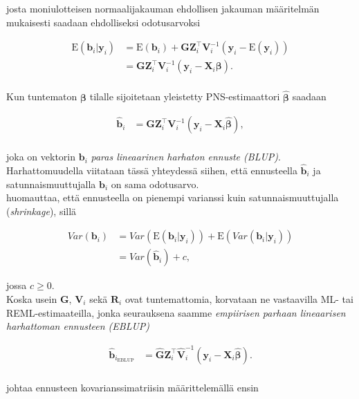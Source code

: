 \documentclass[finnish]{docopts}
\begin{document}
josta moniulotteisen normaalijakauman ehdollisen jakauman määritelmän mukaisesti saadaan ehdolliseksi odotusarvoksi

$$
\begin{aligned}
\text{E}(\bm{b}_i | \bm{y}_i) &= \text{E}(\bm{b}_i) + \bm{G} \bm{Z}_{i}^\top \bm{V}_{i}^{-1}(\bm{y}_i - \text{E}(\bm{y}_i)) \\
&= \bm{G} \bm{Z}_{i}^\top \bm{V}_{i}^{-1}(\bm{y}_i - \bm{X}_i \bm{\beta}). \\
\end{aligned}
$$

Kun tuntematon $\bm{\beta}$ tilalle sijoitetaan yleistetty PNS-estimaattori $\hat{\bm{\beta}}$ saadaan

$$
\begin{aligned}
\hat{\bm{b}}_i &= \bm{G} \bm{Z}_{i}^\top \bm{V}_{i}^{-1}(\bm{y}_i - \bm{X}_i \hat{\bm{\beta}}), \\
\end{aligned}
$$

joka on vektorin $\bm{b}_i$ \textit{paras lineaarinen harhaton ennuste (BLUP)}.\\

Harhattomuudella viitataan tässä yhteydessä siihen, että ennusteella $\hat{\bm{b}}_i$ ja satunnaismuuttujalla $\bm{b}_i$ on sama odotusarvo. \\

\cite{nissinen09} huomauttaa, että ennusteella on pienempi varianssi kuin satunnaismuuttujalla (\textit{shrinkage}), sillä

$$
\begin{aligned}
Var(\bm{b}_i) &= Var(\text{E}(\bm{b}_i | \bm{y}_i)) + \text{E}(Var(\bm{b}_i | \bm{y}_i)) \\
&= Var(\hat{\bm{b}}_i) + c,
\end{aligned}
$$

jossa $c \geq 0$.\\

Koska usein $\bm{G}$, $\bm{V}_{i}$ sekä $\bm{R}_i$ ovat tuntemattomia, korvataan ne vastaavilla ML- tai REML-estimaateilla, jonka seurauksena saamme \textit{empiirisen parhaan lineaarisen harhattoman ennusteen (EBLUP)}

$$
\begin{aligned}
\hat{\bm{b}}_{i_\text{EBLUP}} &= \hat{\bm{G}} \bm{Z}_{i}^\top \hat{\bm{V}}_{i}^{-1}(\bm{y}_i - \bm{X}_i \hat{\bm{\beta}}). \\
\end{aligned}
$$

\cite{nissinen09} johtaa ennusteen kovarianssimatriisin määrittelemällä ensin
\end{document}
